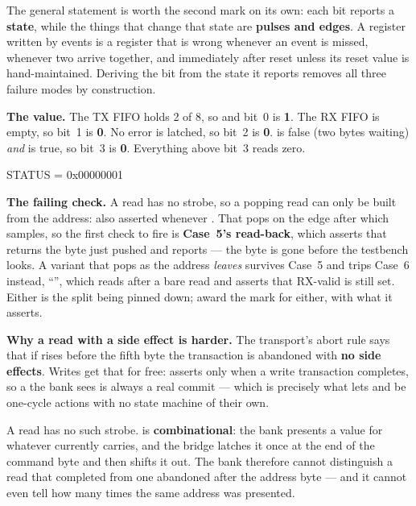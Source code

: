 The general statement is worth the second mark on its own: each bit reports a \textbf{state}, while
the things that change that state are \textbf{pulses and edges}. A register written by events is a
register that is wrong whenever an event is missed, whenever two arrive together, and immediately
after reset unless its reset value is hand-maintained. Deriving the bit from the state it reports
removes all three failure modes by construction.

\textbf{The value.} The TX FIFO holds 2 of 8, so  and bit~0 is \textbf{1}. The
RX FIFO is empty, so bit~1 is \textbf{0}. No error is latched, so bit~2 is \textbf{0}.
 is false (two bytes waiting) \emph{and}  is true, so bit~3 is
\textbf{0}. Everything above bit~3 reads zero.

\begin{console}
STATUS = 0x00000001
\end{console}

\textbf{The failing check.} A read has no strobe, so a popping read can only be built from the
address:  also asserted whenever . That pops on the edge
after which  samples, so the first check to fire is \textbf{Case~5's
 read-back}, which asserts that  returns the byte just pushed and
reports  --- the byte is gone before the testbench
looks. A variant that pops as the address \emph{leaves}  survives Case~5 and trips
Case~6 instead, ``'', which reads  after a bare
 read and asserts that RX-valid is still set. Either is the split being pinned down;
award the mark for either, with what it asserts. 

\textbf{Why a read with a side effect is harder.} The transport's abort rule says that if 
rises before the fifth byte the transaction is abandoned with \textbf{no side effects}. Writes get
that for free:  asserts  only when a write transaction
completes, so a  the bank sees is always a real commit --- which is precisely what
lets  and  be one-cycle actions with no state machine of their own.

A read has no such strobe.  is \textbf{combinational}: the bank presents a value for
whatever  currently carries, and the bridge latches it once at the end of the command
byte and then shifts it out. The bank therefore cannot distinguish a read that completed from one
abandoned after the address byte --- and it cannot even tell how many times the same address was
presented.

